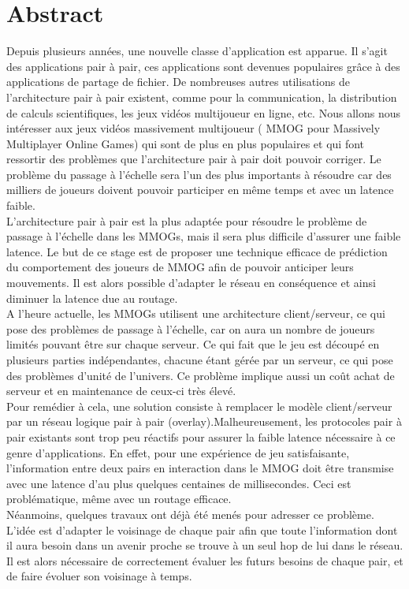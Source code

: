\section{Abstract}

	Depuis plusieurs années, une nouvelle classe d'application est apparue. Il s'agit des applications pair à pair, ces applications sont devenues populaires grâce à des applications de partage de fichier. De nombreuses autres utilisations de l'architecture pair à pair existent, comme pour la communication, la distribution de calculs scientifiques, les jeux vidéos multijoueur en ligne, etc. Nous allons nous intéresser aux jeux vidéos massivement multijoueur ( MMOG pour Massively Multiplayer Online Games) qui sont de plus en plus populaires et qui font ressortir des problèmes que l'architecture pair à pair doit pouvoir corriger. Le problème du passage à l'échelle sera l'un des plus importants à résoudre car des milliers de joueurs doivent pouvoir participer en même temps et avec un latence faible.\\ 
	L'architecture pair à pair est la plus adaptée pour résoudre le problème de passage à l'échelle dans les MMOGs, mais il sera plus difficile d'assurer une faible latence. Le but de ce stage est de proposer une technique efficace de prédiction du comportement des joueurs de MMOG afin de pouvoir anticiper leurs mouvements. Il est alors possible d’adapter le réseau en conséquence et ainsi diminuer la latence due au routage.\\ 
	A l'heure actuelle, les MMOGs utilisent une architecture client/serveur, ce qui pose des problèmes de passage à  l'échelle, car on aura un nombre de joueurs limités pouvant être sur chaque serveur. Ce qui fait que le jeu est découpé en plusieurs parties indépendantes, chacune étant gérée par un serveur, ce qui pose des problèmes d'unité de l'univers. Ce problème implique aussi un coût achat de serveur et en maintenance de ceux-ci très élevé.\\
	Pour remédier à cela, une solution consiste à remplacer le modèle client/serveur par un réseau logique pair à pair (overlay).Malheureusement, les protocoles pair à pair existants sont trop peu réactifs pour assurer la faible latence nécessaire à ce genre d’applications. En effet, pour une expérience de jeu satisfaisante, l’information entre deux pairs en interaction dans le MMOG doit être transmise avec une latence d’au plus quelques centaines de millisecondes. Ceci est problématique, même avec un routage efficace.\\
	Néanmoins, quelques travaux ont déjà été menés pour adresser ce problème. L’idée est d’adapter le voisinage de chaque pair afin que toute l’information dont il aura besoin dans un avenir proche se trouve à un seul hop de lui dans le réseau. Il est alors nécessaire de correctement évaluer les futurs besoins de chaque pair, et de faire évoluer son voisinage à temps.
